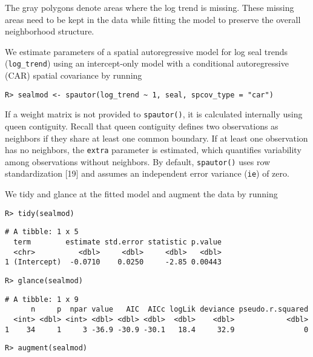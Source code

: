 \documentclass[10pt,letterpaper]{article}
\begin{document}
The gray polygons denote areas where the log trend is missing. These
missing areas need to be kept in the data while fitting the model to
preserve the overall neighborhood structure.

We estimate parameters of a spatial autoregressive model for log seal
trends (\texttt{log\_trend}) using an intercept-only model with a
conditional autoregressive (CAR) spatial covariance by running

\begin{verbatim}
R> sealmod <- spautor(log_trend ~ 1, seal, spcov_type = "car")
\end{verbatim}

If a weight matrix is not provided to \texttt{spautor()}, it is
calculated internally using queen contiguity. Recall that queen
contiguity defines two observations as neighbors if they share at least
one common boundary. If at least one observation has no neighbors, the
\texttt{extra} parameter is estimated, which quantifies variability
among observations without neighbors. By default, \texttt{spautor()}
uses row standardization {[}19{]} and assumes an independent error
variance (\texttt{ie}) of zero.

We tidy and glance at the fitted model and augment the data by running

\begin{verbatim}
R> tidy(sealmod)
\end{verbatim}

\begin{verbatim}
# A tibble: 1 x 5
  term        estimate std.error statistic p.value
  <chr>          <dbl>     <dbl>     <dbl>   <dbl>
1 (Intercept)  -0.0710    0.0250     -2.85 0.00443
\end{verbatim}

\begin{verbatim}
R> glance(sealmod)
\end{verbatim}

\begin{verbatim}
# A tibble: 1 x 9
      n     p  npar value   AIC  AICc logLik deviance pseudo.r.squared
  <int> <dbl> <int> <dbl> <dbl> <dbl>  <dbl>    <dbl>            <dbl>
1    34     1     3 -36.9 -30.9 -30.1   18.4     32.9                0
\end{verbatim}

\begin{verbatim}
R> augment(sealmod)
\end{verbatim}
\end{document}
